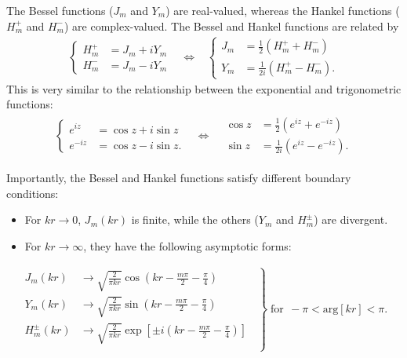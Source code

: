 \documentclass[pra,12pt]{revtex4-2}
\begin{document}
The Bessel functions ($J_m$ and $Y_m$) are real-valued, whereas the
Hankel functions ($H_m^+$ and $H_m^-$) are complex-valued.  The Bessel
and Hankel functions are related by
\begin{align}
  \left\{
  \begin{aligned}
    H_m^+ &= J_m + i Y_m \\
    H_m^- &= J_m - i Y_m
  \end{aligned}\right.
  \;\;\;\Leftrightarrow\;\;\;
  \left\{
  \begin{aligned}
    J_m &=  \frac{1}{2}\left( H_m^+ + H_m^- \right)\\
    Y_m &=  \frac{1}{2i}\left( H_m^+ - H_m^- \right).
  \end{aligned}\right.
  \label{JYHrelation}
\end{align}
This is very similar to the relationship between the exponential and
trigonometric functions:
\begin{align}
  \left\{
  \begin{aligned}
  e^{iz} &= \cos z + i \sin z \\
  e^{-iz} &= \cos z - i \sin z.
  \end{aligned}\right.
  \;\;\;\Leftrightarrow\;\;\;
  \begin{aligned}
    \cos z  &= \frac{1}{2} \left(e^{iz} + e^{-iz}\right) \\
    \sin z &= \frac{1}{2i} \left(e^{iz} - e^{-iz}\right).
  \end{aligned}
  \label{sincos}
\end{align}

Importantly, the Bessel and Hankel functions satisfy different
boundary conditions:
\begin{itemize}
\item For $kr \rightarrow 0$, $J_m(kr)$ is finite, while the others ($Y_m$ and
$H_m^\pm$) are divergent.

\item For $kr \rightarrow \infty$, they have the following asymptotic forms:
\end{itemize}
\begin{align}
  \left.
  \begin{aligned}
    J_m(kr) &\rightarrow
    \sqrt{\frac{2}{\pi kr}} \cos\!\left(kr - \frac{m\pi}{2} - \frac{\pi}{4}\right) \\
    Y_m(kr) &\rightarrow
    \sqrt{\frac{2}{\pi kr}} \sin\!\left(kr - \frac{m\pi}{2} - \frac{\pi}{4}\right) \\
    H_m^\pm(kr) &\rightarrow
    \sqrt{\frac{2}{\pi kr}}
    \exp\left[\pm i\left(kr - \frac{m\pi}{2} - \frac{\pi}{4}\right)\right] \\
  \end{aligned}\;\;
  \right\}
  \; \text{for}\;\, -\pi < \mathrm{arg}[kr] < \pi.
  \label{Jasymptote}
\end{align}
\end{document}
